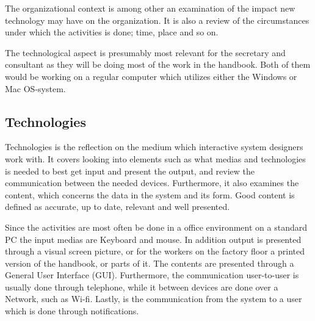 
The organizational context is among other an examination of the impact new technology may have on the organization. 
It is also a review of the circumstances under which the activities is done; time, place and so on.
\citep{Benyon}

The technological aspect is presumably most relevant for the secretary and consultant as they will be doing most of the work in the handbook.
Both of them would be working on a regular computer which utilizes either the Windows or Mac OS-system. 

\subsection{Technologies}
Technologies is the reflection on the medium which interactive system designers work with.
It covers looking into elements such as what medias and technologies is needed to best get input and present the output, and review the communication between the needed devices.
Furthermore, it also examines the content, which concerns the data in the system and its form.
Good content is defined as accurate, up to date, relevant and well presented.
\citep{Benyon}

Since the activities are most often be done in a office environment on a standard PC the input medias are Keyboard and mouse.
In addition output is presented through a visual screen picture, or for the workers on the factory floor a printed version of the handbook, or parts of it.
The contents are presented through a General User Interface (GUI).
Furthermore, the communication user-to-user is usually done through telephone, while it between devices are done over a Network, such as Wi-fi.
Lastly, is the communication from the system to a user which is done through notifications.
